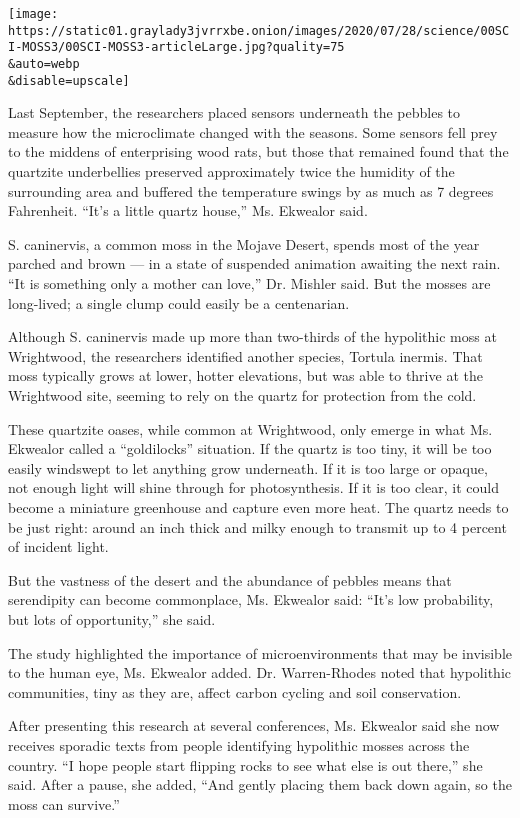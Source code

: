 \texttt{[image: https://static01.graylady3jvrrxbe.onion/images/2020/07/28/science/00SCI-MOSS3/00SCI-MOSS3-articleLarge.jpg?quality=75\\\&auto=webp\\\&disable=upscale]}

Last September, the researchers placed sensors underneath the pebbles to
measure how the microclimate changed with the seasons. Some sensors fell
prey to the middens of enterprising wood rats, but those that remained
found that the quartzite underbellies preserved approximately twice the
humidity of the surrounding area and buffered the temperature swings by
as much as 7 degrees Fahrenheit. ``It's a little quartz house,'' Ms.
Ekwealor said.

S. caninervis, a common moss in the Mojave Desert, spends most of the
year parched and brown --- in a state of suspended animation awaiting
the next rain. ``It is something only a mother can love,'' Dr. Mishler
said. But the mosses are long-lived; a single clump could easily be a
centenarian.

Although S. caninervis made up more than two-thirds of the hypolithic
moss at Wrightwood, the researchers identified another species, Tortula
inermis. That moss typically grows at lower, hotter elevations, but was
able to thrive at the Wrightwood site, seeming to rely on the quartz for
protection from the cold.

These quartzite oases, while common at Wrightwood, only emerge in what
Ms. Ekwealor called a ``goldilocks'' situation. If the quartz is too
tiny, it will be too easily windswept to let anything grow underneath.
If it is too large or opaque, not enough light will shine through for
photosynthesis. If it is too clear, it could become a miniature
greenhouse and capture even more heat. The quartz needs to be just
right: around an inch thick and milky enough to transmit up to 4 percent
of incident light.

But the vastness of the desert and the abundance of pebbles means that
serendipity can become commonplace, Ms. Ekwealor said: ``It's low
probability, but lots of opportunity,'' she said.

The study highlighted the importance of microenvironments that may be
invisible to the human eye, Ms. Ekwealor added. Dr. Warren-Rhodes noted
that hypolithic communities, tiny as they are, affect carbon cycling and
soil conservation.

After presenting this research at several conferences, Ms. Ekwealor said
she now receives sporadic texts from people identifying hypolithic
mosses across the country. ``I hope people start flipping rocks to see
what else is out there,'' she said. After a pause, she added, ``And
gently placing them back down again, so the moss can survive.''


